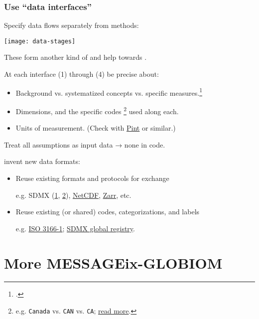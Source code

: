 \documentclass[12pt,aspectratio=169]{beamer}
\begin{document}
\begin{frame}[allowframebreaks]
\frametitle{Use “data interfaces”}

Specify data flows separately from methods:
\smallskip

\texttt{[image: data-stages]}

These form another kind of  and help towards .

\framebreak

At each interface (1) through (4) be precise about:
\begin{itemize}
  \item Background vs. systematized concepts vs. specific measures.\footcite{adcock-collier-2001}
  \item Dimensions, and the specific codes%
    \footnote{e.g. \texttt{Canada} vs. \texttt{CAN} vs. \texttt{CA}; \href{https://paul.kishimoto.name/2021/01/handling-country-codes/}{read more}.}
    used along each.
  \item Units of measurement. (Check with \href{https://pint.readthedocs.io}{Pint} or similar.)
\end{itemize}

\medskip
Treat all assumptions as input data → none in code.

\medskip
{} invent new data formats:
\begin{itemize}
  \item Reuse existing formats and protocols for exchange

    e.g. SDMX (\href{https://sdmx.org}{1}, \href{https://sdmx1.readthedocs.io/en/latest}{2}), \href{https://www.unidata.ucar.edu/software/netcdf/}{NetCDF}, \href{https://zarr.readthedocs.io/en/stable/}{Zarr}, etc.
  \item Reuse existing (or shared) codes, categorizations, and labels

    e.g. \href{https://en.wikipedia.org/wiki/List_of_ISO_3166_country_codes}{ISO 3166-1}; \href{https://registry.sdmx.org/items/codelist.html}{SDMX global registry}.
\end{itemize}

\end{frame}

\section{More MESSAGEix-GLOBIOM}

\begin{frame}
\tableofcontentscurrent
\end{frame}
\end{document}
